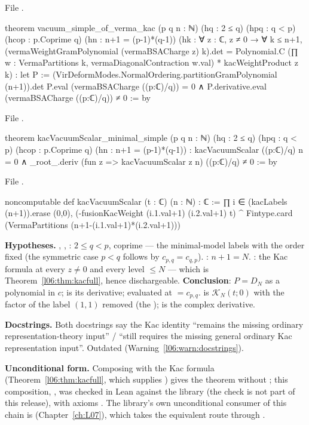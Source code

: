 File .
\begin{leancode}
theorem vacuum_simple_of_verma_kac (p q n : ℕ) (hq : 2 ≤ q)
    (hpq : q < p) (hcop : p.Coprime q) (hn : n+1 = (p-1)*(q-1))
    (hk : ∀ z : ℂ, z ≠ 0 → ∀ k ≤ n+1,
      (vermaWeightGramPolynomial (vermaBSACharge z) k).det =
        Polynomial.C (∏ w : VermaPartitions k, vermaDiagonalContraction w.val) *
          kacWeightProduct z k) :
    let P := (VirDeformModes.NormalOrdering.partitionGramPolynomial (n+1)).det
    P.eval (vermaBSACharge ((p:ℂ)/q)) = 0 ∧
      P.derivative.eval (vermaBSACharge ((p:ℂ)/q)) ≠ 0 := by
\end{leancode}
File .
\begin{leancode}
theorem kacVacuumScalar_minimal_simple (p q n : ℕ) (hq : 2 ≤ q)
    (hpq : q < p) (hcop : p.Coprime q) (hn : n+1 = (p-1)*(q-1)) :
    kacVacuumScalar ((p:ℂ)/q) n = 0 ∧
      _root_.deriv (fun z => kacVacuumScalar z n) ((p:ℂ)/q) ≠ 0 := by
\end{leancode}
File .
\begin{leancode}
noncomputable def kacVacuumScalar (t : ℂ) (n : ℕ) : ℂ :=
  ∏ i ∈ (kacLabels (n+1)).erase (0,0),
    (-fusionKacWeight (i.1.val+1) (i.2.val+1) t) ^
      Fintype.card (VermaPartitions (n+1-(i.1.val+1)*(i.2.val+1)))
\end{leancode}

\begin{dictionary}
\textbf{Hypotheses.} , , : $2\le q<p$, coprime --- the minimal-model labels with
the order fixed (the symmetric case $p<q$ follows by $c_{p,q} = c_{q,p}$). : $n+1 = N$.
: the Kac formula at every $z\ne0$ and every level $\le N$ --- which is
Theorem~\ref{l06:thm:kacfull}, hence dischargeable. \textbf{Conclusion}: $P = D_N$ as a polynomial in $c$;
 is its derivative; evaluated at  $= c_{p,q}$.
 is $\mathcal K_N(t;0)$ with the factor of the label $(1,1)$ removed (the
);  is the complex derivative.

\textbf{Docstrings.} Both docstrings say the Kac identity ``remains the missing ordinary
representation-theory input'' / ``still requires the missing general ordinary Kac representation input''.
Outdated (Warning~\ref{l06:warn:docstrings}).

\textbf{Unconditional form.} Composing  with the Kac formula
(Theorem~\ref{l06:thm:kacfull}, which supplies ) gives the theorem without ; this composition,
, was checked in Lean against the library (the check is not part of this release),
with axioms \lean{[propext, Classical.}\allowbreak{}\allowbreak\lean{sound]}. The library's own unconditional consumer of
this chain is \allowbreak{}\allowbreak{} (Chapter~\ref{ch:L07}), which takes the equivalent route
through \allowbreak{}\allowbreak{}\allowbreak{}.
\end{dictionary}

